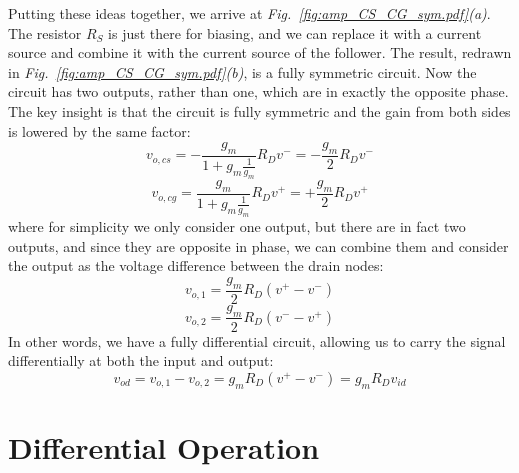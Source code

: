 Putting these ideas together, we arrive at \emph{Fig.~\ref{fig:amp_CS_CG_sym.pdf}(a)}.  The resistor $R_S$ is just there for biasing, and we can replace it with a current source and combine it with the current source of the follower.  The result, redrawn in \emph{Fig.~\ref{fig:amp_CS_CG_sym.pdf}(b)}, is a fully symmetric circuit.  Now the circuit has two outputs, rather than one, which are in exactly the opposite phase.  
The key insight is that the circuit is fully symmetric and the gain from both sides is lowered by the same factor:
    \begin{equation}
        v_{o,cs} = -\frac{g_m}{1+g_m \frac{1}{g_m} } R_D v^- = -\frac{g_m}{2} R_D v^-   
    \end{equation}
    \begin{equation}
        v_{o,cg} = \frac{g_m}{1+g_m \frac{1}{g_m} } R_D v^+ = +\frac{g_m}{2} R_D v^+   
    \end{equation}
where for simplicity we only consider one output, but there are in fact two outputs, and since they are opposite in phase, we can combine them and consider the output as the voltage difference between the drain nodes:
    \begin{equation}
        v_{o,1} = \frac{g_m}{2} R_D (v^+ - v^-)  
    \end{equation}
    \begin{equation}
        v_{o,2} = \frac{g_m}{2} R_D (v^- - v^+)  
    \end{equation}
In other words, we have a fully differential circuit, allowing us to carry the signal differentially at both the input and output:
    \begin{equation}
        v_{od} = v_{o,1} - v_{o,2} = g_m R_D (v^+ - v^-) = g_m R_D v_{id}  
    \end{equation}
\section{Differential Operation}
